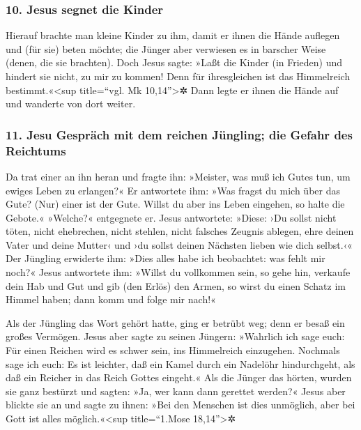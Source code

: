 \hypertarget{jesus-segnet-die-kinder}{%
\subsubsection{10. Jesus segnet die
Kinder}\label{jesus-segnet-die-kinder}}

 Hierauf brachte man kleine Kinder zu ihm, damit er ihnen
die Hände auflegen und (für sie) beten möchte; die Jünger aber verwiesen
es in barscher Weise (denen, die sie brachten).  Doch
Jesus sagte: »Laßt die Kinder (in Frieden) und hindert sie nicht, zu mir
zu kommen! Denn für ihresgleichen ist das Himmelreich
bestimmt.«\textless sup title=``vgl. Mk 10,14''\textgreater✲
 Dann legte er ihnen die Hände auf und wanderte von dort
weiter.

\hypertarget{jesu-gespruxe4ch-mit-dem-reichen-juxfcngling-die-gefahr-des-reichtums}{%
\subsubsection{11. Jesu Gespräch mit dem reichen Jüngling; die Gefahr
des
Reichtums}\label{jesu-gespruxe4ch-mit-dem-reichen-juxfcngling-die-gefahr-des-reichtums}}

 Da trat einer an ihn heran und fragte ihn: »Meister, was
muß ich Gutes tun, um ewiges Leben zu erlangen?«  Er
antwortete ihm: »Was fragst du mich über das Gute? (Nur) einer ist der
Gute. Willst du aber ins Leben eingehen, so halte die Gebote.«
 »Welche?« entgegnete er. Jesus antwortete: »Diese: ›Du
sollst nicht töten, nicht ehebrechen, nicht stehlen, nicht falsches
Zeugnis ablegen,  ehre deinen Vater und deine Mutter‹ und
›du sollst deinen Nächsten lieben wie dich selbst.‹«  Der
Jüngling erwiderte ihm: »Dies alles habe ich beobachtet: was fehlt mir
noch?«  Jesus antwortete ihm: »Willst du vollkommen sein,
so gehe hin, verkaufe dein Hab und Gut und gib (den Erlös) den Armen, so
wirst du einen Schatz im Himmel haben; dann komm und folge mir nach!«

 Als der Jüngling das Wort gehört hatte, ging er betrübt
weg; denn er besaß ein großes Vermögen.  Jesus aber sagte
zu seinen Jüngern: »Wahrlich ich sage euch: Für einen Reichen wird es
schwer sein, ins Himmelreich einzugehen.  Nochmals sage
ich euch: Es ist leichter, daß ein Kamel durch ein Nadelöhr
hindurchgeht, als daß ein Reicher in das Reich Gottes eingeht.«
 Als die Jünger das hörten, wurden sie ganz bestürzt und
sagten: »Ja, wer kann dann gerettet werden?«  Jesus aber
blickte sie an und sagte zu ihnen: »Bei den Menschen ist dies unmöglich,
aber bei Gott ist alles möglich.«\textless sup title=``1.Mose
18,14''\textgreater✲

